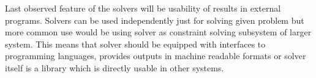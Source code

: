 Last observed feature of the solvers will be usability of results in external 
programs. Solvers can be used independently just for solving given problem but 
more common use would be using solver as constraint solving subsystem of larger 
system. This means that solver should be equipped with interfaces to programming 
languages, provides outputs in machine readable formats or solver itself is a 
library which is directly usable in other systems.
